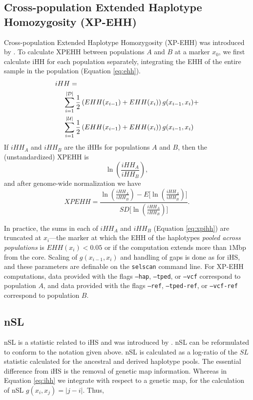 \documentclass[12pt]{article}%
\newcommand{\negspace}{\!\!\!\!\!\!\!\!\!\!\!\!}
\begin{document}
\subsection{Cross-population Extended Haplotype Homozygosity (XP-EHH)}\label{sec:xpehh}

Cross-population Extended Haplotype Homozygosity (XP-EHH) was introduced by \cite{SabetiEtAl07}. To calculate XPEHH between populations $A$ and $B$ at a marker $x_0$, we first calculate iHH for each population separately, integrating the EHH of the entire sample in the population (Equation \ref{eq:ehh}).
\begin{align}\label{eq:xpihh}
iHH =&\notag\\
&\negspace\sum_{i = 1}^{|\mathcal{D}|} \frac{1}{2}\left(EHH(x_{i-1}) + EHH(x_i)\right)g(x_{i-1},x_i) + \notag\\
&\negspace\sum_{i = 1}^{|\mathcal{U}|} \frac{1}{2}\left(EHH(x_{i-1}) + EHH(x_i)\right)g(x_{i-1},x_i)
\end{align}
If $iHH_A$ and $iHH_B$ are the iHHs for populations $A$ and $B$, then the 
(unstandardized) XPEHH is
\begin{equation}
\ln\left(\frac{iHH_A}{iHH_B}\right),
\end{equation}
and after genome-wide normalization we have
\begin{equation}
XPEHH = \frac{\ln\left(\frac{iHH_A}{iHH_B}\right) - E\Big[\ln\left(\frac{iHH_A}{iHH_B}\right)\Big]}{SD\Big[\ln\left(\frac{iHH_A}{iHH_B}\right)\Big]}.
\end{equation}

In practice, the sums in each of $iHH_A$ and $iHH_B$ (Equation \ref{eq:xpihh}) 
are truncated at $x_i$---the marker at which the EHH of the haplotypes {\it 
pooled across populations} is $EHH(x_i) < 0.05$ or if the computation extends more than $1$Mbp from the core.  Scaling of $g(x_{i-1},x_i)$ 
and handling of gaps is done as for iHS, and these parameters are definable 
on the {\tt selscan} command line. For XP-EHH computations, data provided with the flags {\tt --hap}, {\tt --tped}, or {\tt --vcf} correspond to population $A$, and data provided with the flags {\tt --ref}, {\tt --tped-ref}, or {\tt --vcf-ref} correspond to population $B$.

\subsection{nSL}\label{sec:nsl}

nSL is a statistic related to iHS and was introduced by \cite{FerrerAdmetllaEtAl14}.  nSL can be reformulated to conform to the notation given above.  nSL is calculated as a log-ratio of the $SL$ statistic calculated for the ancestral and derived haplotype pools.  The essential difference from iHS is the removal of genetic map information.  Whereas in Equation \ref{eq:ihh} we integrate with respect to a genetic map, for the calculation of nSL $g(x_i,x_j) = |j-i|$.  Thus,
\end{document}
